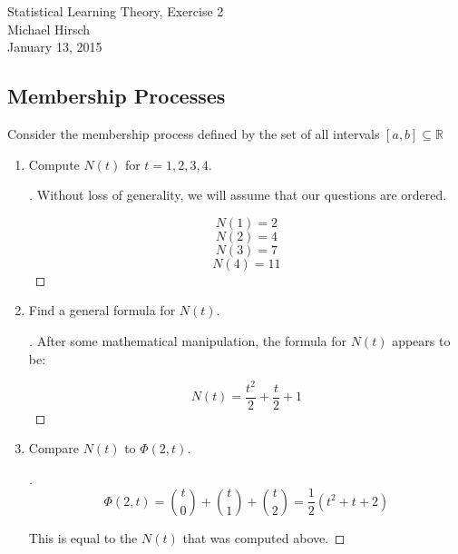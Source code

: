 \documentclass[]{book}
\theoremstyle{definition}
\begin{document}
\begin{center}
{\Large Statistical Learning Theory, Exercise 2}\\
Michael Hirsch\\ %
January 13, 2015 %
\end{center}

\vspace{0.2 cm}


\subsection*{Membership Processes}

Consider the membership process defined by the set of all intervals $[a, b] \subseteq \mathbb{R}$


\begin{enumerate}
\item\label{norms}

Compute $N(t)$ for $t = 1, 2, 3, 4$.

\begin{proof}[\unskip\nopunct]

Without loss of generality, we will assume that our questions are ordered. 

$$N(1) = 2$$
$$N(2) = 4$$
$$N(3) = 7$$
$$N(4) = 11$$



\end{proof}

\item

Find a general formula for $N(t)$.

\begin{proof}[\unskip\nopunct]

After some mathematical manipulation, the formula for $N(t)$ appears to be:

$$N(t) = \dfrac{t^{2}}{2} + \dfrac{t}{2} + 1 $$

\end{proof}

\item	

Compare $N(t)$ to $\Phi(2,t)$.

\begin{proof}[\unskip\nopunct]
		
$$\Phi(2,t) = {t \choose 0} + {t \choose 1} + {t \choose 2} = \dfrac{1}{2}(t^{2}+t+2) $$

This is equal to the $N(t)$ that was computed above.

\end{proof}

\end{enumerate}
\end{document}
